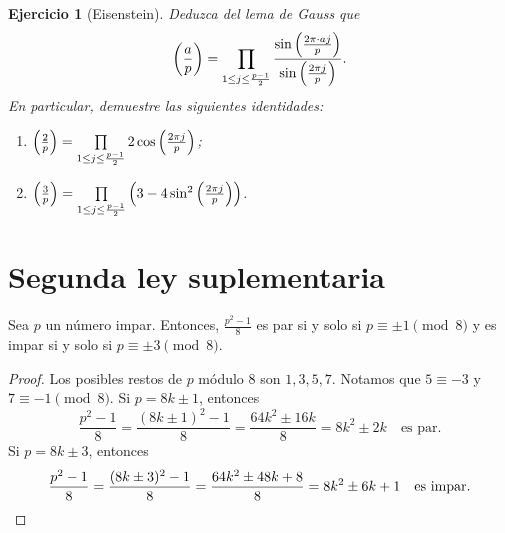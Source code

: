 \documentclass{article}
\theoremstyle{plain}
\newtheorem{ejerc}{Ejercicio}
\begin{document}
\begin{ejerc}[Eisenstein]
  Deduzca del lema de Gauss que
  $$\left(\frac{a}{p}\right) = \prod_{1 \le j \le \frac{p-1}{2}} \frac{\sin \left(\frac{2\pi \cdot aj}{p}\right)}{\sin \left(\frac{2\pi j}{p}\right)}.$$
  En particular, demuestre las siguientes identidades:
  \begin{enumerate}
  \item[a)]
    $\left(\frac{2}{p}\right) =
    \prod\limits_{1 \le j \le \frac{p-1}{2}} 2\cos \left(\frac{2\pi j}{p}\right)$;

  \item[b)]
    $\left(\frac{3}{p}\right) =
    \prod\limits_{1 \le j \le \frac{p-1}{2}}
    \left(3 - 4\sin^2 \left(\frac{2\pi j}{p}\right)\right)$.
  \end{enumerate}
\end{ejerc}


\section{Segunda ley suplementaria}

\begin{observacion}
  Sea $p$ un número impar. Entonces, $\frac{p^2-1}{8}$ es par si y solo si
  $p \equiv \pm 1 \pmod{8}$ y es impar si y solo si $p \equiv \pm 3 \pmod{8}$.
\end{observacion}

\begin{proof}
  Los posibles restos de $p$ módulo $8$ son $1,3,5,7$. Notamos que $5 \equiv -3$
  y $7 \equiv -1 \pmod{8}$.  Si $p = 8k \pm 1$, entonces
  $$\frac{p^2-1}{8} = \frac{(8k\pm 1)^2 - 1}{8} = \frac{64 k^2 \pm 16 k}{8} = 8 k^2 \pm 2k \quad \text{es par}.$$
  Si $p = 8k \pm 3$, entonces
  \[ \frac{p^2-1}{8} = \frac{(8k \pm 3)^2 - 1}{8} =
    \frac{64 k^2 \pm 48 k + 8}{8} = 8 k^2 \pm 6 k + 1 \quad \text{es
      impar}. \qedhere \]
\end{proof}
\end{document}
